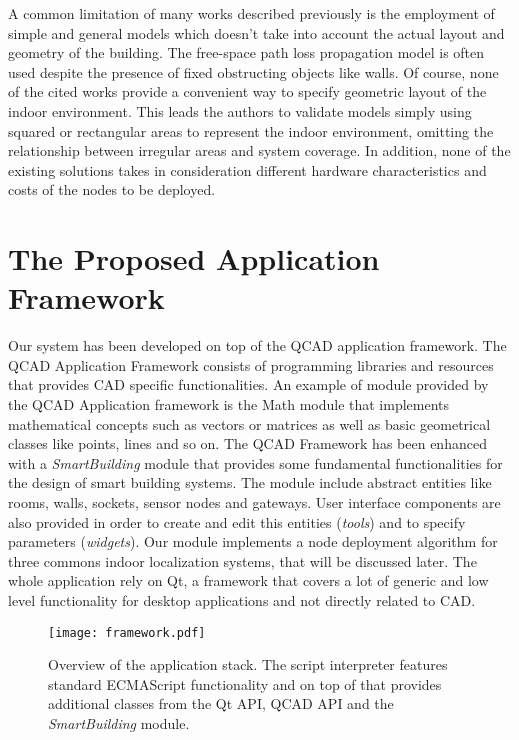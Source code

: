 A common limitation of many works described previously is the employment of simple and general models which doesn't take into account the actual layout and geometry of the building. The free-space path loss propagation model is often used despite the presence of fixed obstructing objects like walls. Of course, none of the cited works provide a convenient way to specify geometric layout of the indoor environment. This leads the authors to validate models simply using squared or rectangular areas to represent the indoor environment, omitting the relationship between irregular areas and system coverage.
In addition, none of the existing solutions takes in consideration different hardware characteristics and costs of the nodes to be deployed.

\section{The Proposed Application Framework}\label{sec:components}
Our system has been developed on top of the QCAD application framework. The QCAD Application Framework consists of programming libraries and resources that provides CAD specific functionalities. An example of module provided by the QCAD Application framework is the Math module that implements mathematical concepts such as vectors or matrices as well as basic geometrical classes like points, lines and so on. The QCAD Framework has been enhanced with a \emph{SmartBuilding} module that provides some fundamental functionalities for the design of smart building systems. The module include abstract entities like rooms, walls, sockets, sensor nodes and gateways. User interface components are also provided in order to create and edit this entities (\emph{tools}) and to specify parameters (\emph{widgets}). Our module implements a node deployment algorithm for three commons indoor localization systems, that will be discussed later.
The whole application rely on Qt, a framework that covers a lot of generic and low level functionality for desktop applications and not directly related to CAD.
\begin{figure}[h!tb]
\centering\texttt{[image: framework.pdf]}
\caption[Overview of the CAD application framework stack.]{Overview of the application stack. The script interpreter features standard ECMAScript functionality and on top of that provides additional classes from the Qt API, QCAD API and the \emph{SmartBuilding} module.}
\end{figure}

